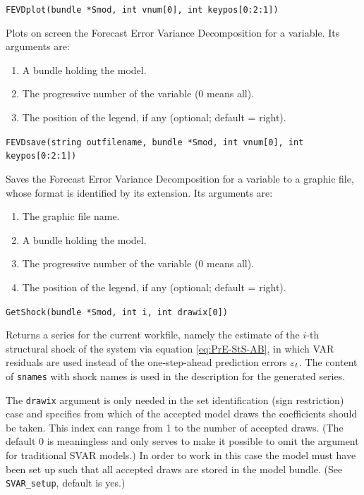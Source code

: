 \documentclass[a4paper,10pt]{article}
\newenvironment{funcdoc}[1]
{\noindent\hrulefill\newline\nopagebreak\texttt{#1}%
\nopagebreak\par\noindent\hrulefill%
\nopagebreak\par\nopagebreak\smallskip\nopagebreak\par}
{\bigskip}
\newcounter{script}[section]
\newcommand{\PrE}[1]{\ensuremath \varepsilon_{#1}}
\begin{document}
\begin{funcdoc}{FEVDplot(bundle *Smod, int vnum[0], int keypos[0:2:1])}
  Plots on screen the Forecast Error Variance Decomposition for a
  variable. Its arguments are:
  \begin{enumerate}
  \item A bundle holding the model.
  \item The progressive number of the variable (0 means all).
  \item The position of the legend, if any (optional; default = right).
  \end{enumerate}
\end{funcdoc}

\begin{funcdoc}{FEVDsave(string outfilename, bundle *Smod, int vnum[0], int keypos[0:2:1])}
  Saves the Forecast Error Variance Decomposition for a variable to a
  graphic file, whose format is identified by its extension. Its
  arguments are:
  \begin{enumerate}
  \item The graphic file name.
  \item A bundle holding the model.
  \item The progressive number of the variable (0 means all).
  \item The position of the legend, if any (optional; default = right).
  \end{enumerate}
\end{funcdoc}

\begin{funcdoc}{GetShock(bundle *Smod, int i, int drawix[0])}
  Returns a series for the current workfile, namely the estimate of the 
  $i$-th structural shock of
  the system via equation \eqref{eq:PrE-StS-AB}, in which VAR
  residuals are used instead of the one-step-ahead prediction errors
  $\PrE{t}$. The content of
  \texttt{snames} with shock names is used in the description
  for the generated series.
  
  The \texttt{drawix} argument is only needed in the set identification 
  (sign restriction) case and specifies from which of the accepted model draws 
  the coefficients should be taken. This index can range from 1 to the number
  of accepted draws. (The default 0 is meaningless and only serves
  to make it possible to omit the argument for traditional SVAR models.) 
  In order to work in this case the model must have been set up such that all
  accepted draws are stored in the model bundle. (See \texttt{SVAR\_setup},
  default is yes.)
\end{funcdoc}
\end{document}
